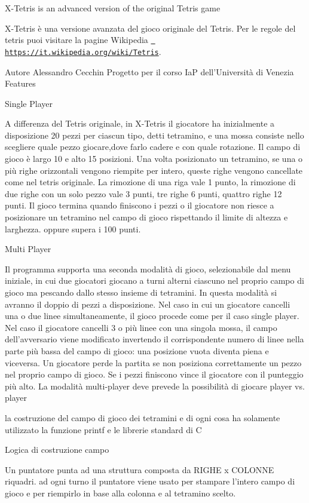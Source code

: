 X-\/\+Tetris is an advanced version of the original Tetris game

X-\/\+Tetris è una versione avanzata del gioco originale del Tetris. Per le regole del tetris puoi visitare la pagine Wikipedia \href{https://it.wikipedia.org/wiki/Tetris}{\texttt{ https\+://it.\+wikipedia.\+org/wiki/\+Tetris}}.

Autore Alessandro Cecchin Progetto per il corso IaP dell’\+Università di Venezia Features

Single Player

A differenza del Tetris originale, in X-\/\+Tetris il giocatore ha inizialmente a disposizione 20 pezzi per ciascun tipo, detti tetramino, e una mossa consiste nello scegliere quale pezzo giocare,dove farlo cadere e con quale rotazione. Il campo di gioco è largo 10 e alto 15 posizioni. Una volta posizionato un tetramino, se una o più righe orizzontali vengono riempite per intero, queste righe vengono cancellate come nel tetris originale. La rimozione di una riga vale 1 punto, la rimozione di due righe con un solo pezzo vale 3 punti, tre righe 6 punti, quattro righe 12 punti. Il gioco termina quando finiscono i pezzi o il giocatore non riesce a posizionare un tetramino nel campo di gioco rispettando il limite di altezza e larghezza. oppure supera i 100 punti.

Multi Player

Il programma supporta una seconda modalità di gioco, selezionabile dal menu iniziale, in cui due giocatori giocano a turni alterni ciascuno nel proprio campo di gioco ma pescando dallo stesso insieme di tetramini. In questa modalità si avranno il doppio di pezzi a disposizione. Nel caso in cui un giocatore cancelli una o due linee simultaneamente, il gioco procede come per il caso single player. Nel caso il giocatore cancelli 3 o più linee con una singola mossa, il campo dell’avversario viene modificato invertendo il corrispondente numero di linee nella parte più bassa del campo di gioco\+: una posizione vuota diventa piena e viceversa. Un giocatore perde la partita se non posiziona correttamente un pezzo nel proprio campo di gioco. Se i pezzi finiscono vince il giocatore con il punteggio più alto. La modalità multi-\/player deve prevede la possibilità di giocare player vs. player

la costruzione del campo di gioco dei tetramini e di ogni cosa ha solamente utilizzato la funzione printf e le librerie standard di C

Logica di costruzione campo

Un puntatore punta ad una struttura composta da RIGHE x COLONNE riquadri. ad ogni turno il puntatore viene usato per stampare l’intero campo di gioco e per riempirlo in base alla colonna e al tetramino scelto. 